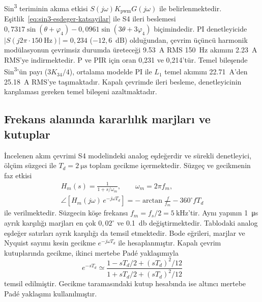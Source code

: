 Sin\textsuperscript{3} teriminin akıma etkisi $S(j\omega)K_{\mathrm{pwm}}G(j\omega)$ ile belirlenmektedir. Eşitlik~\eqref{eq:sin3-esdeger-katsayilar} ile S4 ileri beslemesi $0{,}7317\sin(\theta+\varphi_4)-0{,}0961\sin(3\theta+3\varphi_4)$ biçimindedir. PI denetleyicide $|S(j2\pi\cdot\SI{150}{\hertz})|=0{,}234$ ($-12{,}6$~dB) olduğundan, çevrim üçüncü harmonik modülasyonun çevrimsiz durumda üreteceği \SI{9.53}{\ampere} RMS \SI{150}{\hertz} akımını \SI{2.23}{\ampere} RMS'ye indirmektedir. P ve PIR için oran 0,231 ve 0,214'tür. Temel bileşende Sin\textsuperscript{3}'ün payı ($3K_{34}/4$), ortalama modelde PI ile $L_1$ temel akımını \SI{22.71}{\ampere}'den \SI{25.18}{\ampere} RMS'ye taşımaktadır. Kapalı çevrimde ileri besleme, denetleyicinin karşılaması gereken temel bileşeni azaltmaktadır.

\subsection{Frekans alanında kararlılık marjları ve kutuplar}

İncelenen akım çevrimi S4 modelindeki analog eşdeğerdir ve sürekli denetleyici, ölçüm süzgeci ile $T_d=\SI{2}{\micro\second}$ toplam gecikme içermektedir. Süzgeç ve gecikmenin faz etkisi
\begin{equation}
  \begin{gathered}
    H_m(s)=\frac{1}{1+s/\omega_m},\qquad \omega_m=2\pi f_m,\\
    \angle\!\left[H_m(j\omega)\,e^{-j\omega T_d}\right]=-\arctan\frac{f}{f_m}-360^{\circ}fT_d
  \end{gathered}
  \label{eq:olcum-gecikme-fazi}
\end{equation}
ile verilmektedir. Süzgecin köşe frekansı $f_m=f_s/2=\SI{5}{\kilo\hertz}$'tir. Aynı yapının \SI{1}{\micro\second} ayrık karşılığı marjları en çok $0{,}02^{\circ}$ ve \SI{0.1}{\decibel} değiştirmektedir. Tablodaki analog eşdeğer satırları ayrık karşılığı da temsil etmektedir. Bode eğrileri, marjlar ve Nyquist sayımı kesin gecikme $e^{-j\omega T_d}$ ile hesaplanmıştır. Kapalı çevrim kutuplarında gecikme, ikinci mertebe Padé yaklaşımıyla
\begin{equation}
  e^{-sT_d}\simeq\frac{1-sT_d/2+(sT_d)^2/12}{1+sT_d/2+(sT_d)^2/12}
  \label{eq:pade-yaklasimi}
\end{equation}
temsil edilmiştir. Gecikme taramasındaki kutup hesabında ise altıncı mertebe Padé yaklaşımı kullanılmıştır.

